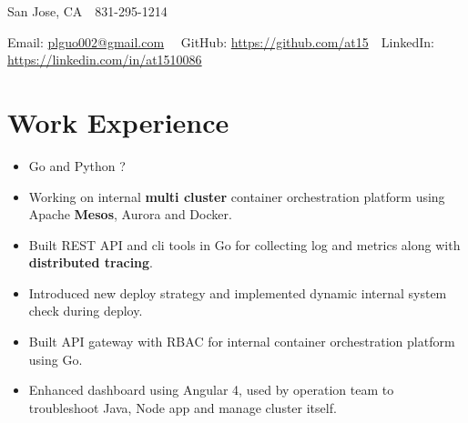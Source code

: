 \documentclass[11pt, letterpaper]{simple-cv}
\begin{document}
\centerline{
	San Jose, CA\ \
	831-295-1214\ \
}
\centerline{
	Email: \href{plguo002@gmail.com}{plguo002@gmail.com}\ \
	GitHub: \href{https://github.com/at15}{https://github.com/at15}\ \
	LinkedIn: \href{https://www.linkedin.com/in/at1510086}{https://linkedin.com/in/at1510086}}

\section{Work Experience}

\begin{itemize}
	\item Go and Python ?
\end{itemize}

\begin{itemize}
	\item Working on internal \textbf{multi cluster} container orchestration platform using Apache \textbf{Mesos}, Aurora and Docker.
	\item Built REST API and cli tools in Go for collecting log and metrics along with \textbf{distributed tracing}.
	\item Introduced new deploy strategy and implemented dynamic internal system check during deploy.
\end{itemize}

\begin{itemize}
	\item Built API gateway with RBAC for internal container orchestration platform using Go.
	\item Enhanced dashboard using Angular 4, used by operation team to troubleshoot Java, Node app and manage cluster itself.
\end{itemize}
\end{document}
